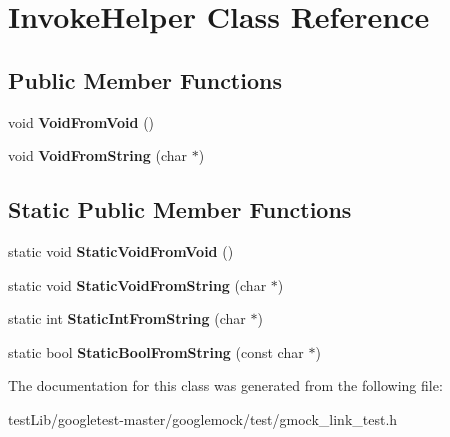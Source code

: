 \hypertarget{classInvokeHelper}{}\section{Invoke\+Helper Class Reference}
\label{classInvokeHelper}
\subsection*{Public Member Functions}
\begin{DoxyCompactItemize}
\item 
\mbox{\label{classInvokeHelper_a6371bcb64a8f01093f6fdef60776a031}} 
void {\bfseries Void\+From\+Void} ()
\item 
\mbox{\label{classInvokeHelper_a89f02dc384e6b5a7d935b7ea0a81cc9e}} 
void {\bfseries Void\+From\+String} (char $\ast$)
\end{DoxyCompactItemize}
\subsection*{Static Public Member Functions}
\begin{DoxyCompactItemize}
\item 
\mbox{\label{classInvokeHelper_ae96b5bd7c4fa328d0a87bc986f135fe8}} 
static void {\bfseries Static\+Void\+From\+Void} ()
\item 
\mbox{\label{classInvokeHelper_a5e95ce4214e89b180da9953d94396536}} 
static void {\bfseries Static\+Void\+From\+String} (char $\ast$)
\item 
\mbox{\label{classInvokeHelper_a5cfb11cca70ec5a9f59e8b7a4d4c2f85}} 
static int {\bfseries Static\+Int\+From\+String} (char $\ast$)
\item 
\mbox{\label{classInvokeHelper_aef16e38107cd8ddc0a52d7d0ab153211}} 
static bool {\bfseries Static\+Bool\+From\+String} (const char $\ast$)
\end{DoxyCompactItemize}


The documentation for this class was generated from the following file\+:\begin{DoxyCompactItemize}
\item 
test\+Lib/googletest-\/master/googlemock/test/gmock\+\_\+link\+\_\+test.\+h\end{DoxyCompactItemize}
